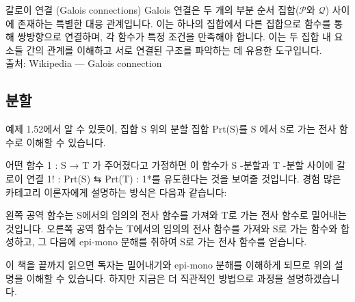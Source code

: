 \documentclass[11pt, a4paper, twoside, openany]{book}
\begin{document}
\begin{deepresearch}{갈로이 연결 (Galois connections)}
Galois 연결은 두 개의 부분 순서 집합($\mathcal{P}$와 $\mathcal{Q}$) 사이에 존재하는 특별한 대응 관계입니다. 이는 하나의 집합에서 다른 집합으로 함수를 통해 쌍방향으로 연결하며, 각 함수가 특정 조건을 만족해야 합니다.  이는 두 집합 내 요소들 간의 관계를 이해하고 서로 연결된 구조를 파악하는 데 유용한 도구입니다.
\\[4pt]{\footnotesize\color{ctgray} 출처: Wikipedia — Galois connection}
\end{deepresearch}


\subsection{분할}
\label{sec:1-4-2}

예제 1.52\hspace{0pt}에서 알 수 있듯이, 집합 S 위의 분할 집합 Prt(S)를 S 에서 S\hspace{0pt}로 가는 전사 함수로 이해할 수 있습니다.

\par\medskip
어떤 함수 1 : S → T 가 주어졌다고 가정하면 이 함수가 S -분할과 T -분할 사이에 갈로이 연결 1! : Prt(S) ⇆ Prt(T) : 1*를 유도한다는 것을 보여줄 것입니다. 경험 많은 카테고리 이론자에게 설명하는 방식은 다음과 같습니다:

\par\medskip
왼쪽 공역 함수는 S\hspace{0pt}에서의 임의의 전사 함수를 가져와 T\hspace{0pt}로 가는 전사 함수로 밀어내는 것입니다. 오른쪽 공역 함수는 T\hspace{0pt}에서의 임의의 전사 함수를 가져와 S\hspace{0pt}로 가는 함수와 합성하고, 그 다음에 epi-mono 분해를 취하여 S\hspace{0pt}로 가는 전사 함수를 얻습니다.

\par\medskip
이 책을 끝까지 읽으면 독자는 밀어내기와 epi-mono 분해를 이해하게 되므로 위의 설명을 이해할 수 있습니다. 하지만 지금은 더 직관적인 방법으로 과정을 설명하겠습니다.
\end{document}
